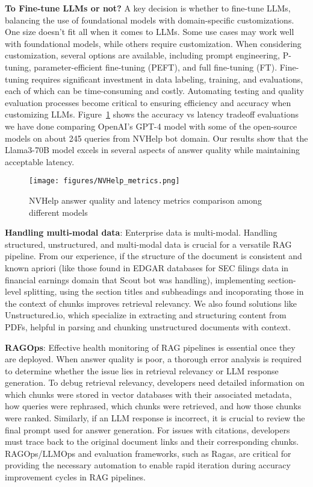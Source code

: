 \documentclass[sigconf]{acmart}
\begin{document}
\noindent \textbf{To Fine-tune LLMs or not?} A key decision is whether to fine-tune LLMs, balancing the use of foundational models with domain-specific customizations. One size doesn’t fit all when it comes to LLMs. Some use cases may work well with foundational models, while others require customization. When considering customization, several options are available, including prompt engineering, P-tuning, parameter-efficient fine-tuning (PEFT), and full fine-tuning (FT). Fine-tuning requires significant investment in data labeling, training, and evaluations, each of which can be time-consuming and costly. Automating testing and quality evaluation processes become critical to ensuring efficiency and accuracy when customizing LLMs. Figure~\ref{fig:modelperf} shows the accuracy vs latency tradeoff evaluations we have done comparing OpenAI’s GPT-4 model with some of the open-source models on about 245 queries from NVHelp bot domain. Our results show that the Llama3-70B model excels in several aspects of answer quality while maintaining acceptable latency.

\begin{figure}[tp!]
    \centering
    \texttt{[image: figures/NVHelp\_metrics.png]}
    \vspace{-3mm}
    \caption{NVHelp answer quality and latency metrics comparison among different models}
    \vspace{-3mm}
    \label{fig:modelperf}
\end{figure}



\noindent \textbf{Handling multi-modal data}: Enterprise data is multi-modal. Handling structured, unstructured, and multi-modal data is crucial for a versatile RAG pipeline. From our experience, if the structure of the document is consistent and known apriori (like those found in EDGAR databases for SEC filings data in financial earnings domain that Scout bot was handling), implementing section-level splitting, using the section titles and subheadings and incoporating those in the context of chunks improves retrieval relevancy. We also found solutions like Unstructured.io, which specialize in extracting and structuring content from PDFs, helpful in parsing and chunking unstructured documents with context.

\noindent \textbf{RAGOps}: Effective health monitoring of RAG pipelines is essential once they are deployed. When answer quality is poor, a thorough error analysis is required to determine whether the issue lies in retrieval relevancy or LLM response generation. To debug retrieval relevancy, developers need detailed information on which chunks were stored in vector databases with their associated metadata, how queries were rephrased, which chunks were retrieved, and how those chunks were ranked. Similarly, if an LLM response is incorrect, it is crucial to review the final prompt used for answer generation. For issues with citations, developers must trace back to the original document links and their corresponding chunks. RAGOps/LLMOps and evaluation frameworks, such as Ragas, are critical for providing the necessary automation to enable rapid iteration during accuracy improvement cycles in RAG pipelines. 
\end{document}
